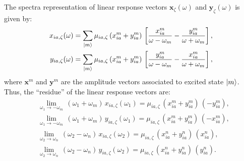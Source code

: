 \documentclass[11pt,a4paper]{article}
\begin{document}
The spectra representation of linear response vectors $\mathbf x_\zeta(\omega)$ and $\mathbf y_\zeta(\omega)$ is given by:\begin{align*}
	x_{ia,\zeta}(\omega) &= \sum_{\ket{m}} \mu_{ia,\zeta}\,(x^{m}_{ia} + y^{m}_{ia})\,\left[\frac{x_{ia}^{m}}{\omega-\omega_m}-\frac{y_{ia}^{m}}{\omega+\omega_m}\right],\\
	y_{ia,\zeta}(\omega) &= \sum_{\ket{m}} \mu_{ia,\zeta}\,(x^{m}_{ia} + y^{m}_{ia})\,\left[\frac{y_{ia}^{m}}{\omega-\omega_m}-\frac{x_{ia}^{m}}{\omega+\omega_m}\right],
\end{align*}
where $\mathbf x^m$ and $\mathbf y^m$ are the amplitude vectors associated to excited state $\ket{m}$.  
Thus, the ``residue'' of the linear response vectors are:\begin{align*}
	&\lim_{\omega_1\to-\omega_m}\,(\omega_1+\omega_m)\,	x_{ia,\zeta}(\omega_1) =  \mu_{ia,\zeta}\,(x^{m}_{ia} + y^{m}_{ia})\,(-y_{ia}^m), \\
	&\lim_{\omega_1\to-\omega_m}\,(\omega_1+\omega_m)\,	y_{ia,\zeta}(\omega_1) =  \mu_{ia,\zeta}\,(x^{m}_{ia} + y^{m}_{ia})\,(-x_{ia}^m), \\
	&\lim_{\omega_2\to\omega_n}\,(\omega_2-\omega_n)\,	x_{ia,\zeta}(\omega_2) =  \mu_{ia,\zeta}\,(x^{n}_{ia} + y^{n}_{ia})\,(x_{ia}^n), \\
	&\lim_{\omega_2\to\omega_n}\,(\omega_2-\omega_n)\,y_{ia,\zeta}(\omega_2) =  \mu_{ia,\zeta}\,(x^{n}_{ia} + y^{n}_{ia})\,(y_{ia}^n).
\end{align*}
\end{document}
